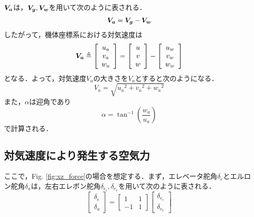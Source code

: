 $\mbox{\boldmath $V_a$}$は，$\mbox{\boldmath $V_g$},\mbox{\boldmath $V_w$}$を用いて次のように表される．
\begin{equation}
  \mbox{\boldmath $V_a$} = \mbox{\boldmath $V_g$} - \mbox{\boldmath $V_w$}
\end{equation}
したがって，機体座標系における対気速度は
\begin{equation}
  \mbox{\boldmath $V_a$} \triangleq
  \left[
    \begin{array}{ccc}
      u_a \\
      v_a \\
      w_a
    \end{array}
  \right] =
  \left[
    \begin{array}{ccc}
      u \\
      v \\
      w \\
    \end{array}
  \right] -
  \left[
    \begin{array}{ccc}
      u_w \\
      v_w \\
      w_w
    \end{array}
  \right]
\end{equation}
となる．よって，対気速度\mbox{\boldmath $V_a$}の大きさを$V_a$とすると次のようになる．
\begin{equation}
  V_a = \sqrt{{u_a}^2+{v_a}^2+{w_a}^2}
\end{equation}
また，$\alpha$は迎角であり
\begin{equation}
  \alpha = \tan^{-1}\left(\dfrac{w_a}{u_a}\right)
\end{equation}
で計算される．

\subsection{対気速度により発生する空気力}
\label{sec:airspeed_airf}

ここで，Fig. \ref{fig:xz_force}の場合を想定する．まず，エレベータ舵角$\delta_e$とエルロン舵角$\delta_a$は，左右エレボン舵角$\delta_{e_l}, \delta_{e_r}$を用いて次のように表される．
\begin{equation}
  \left[
    \begin{array}{ccc}
      \delta_e \\
      \delta_a
    \end{array}
  \right] =
  \left[
    \begin{array}{ccc}
      1 & 1 \\
      -1 & 1
    \end{array}
  \right]
  \left[
    \begin{array}{ccc}
      \delta_{e_r} \\
      \delta_{e_l}
    \end{array}
  \right]
\end{equation}

